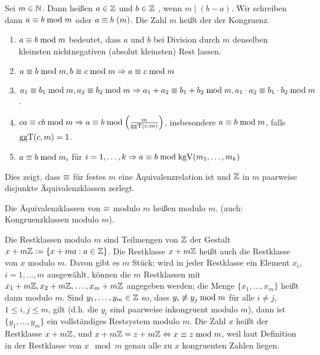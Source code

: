 \begin{defn}
	Sei $m \in \mathbb{N}$. 
	Dann heißen $a \in \mathbb{Z}$ und $b \in \mathbb{Z}$ , wenn $m \mid (b-a)$. 
	Wir schreiben dann $a \equiv b \bmod m$ oder $a \equiv b \ (m)$. 
	Die Zahl $m$ heißt der  der Kongruenz. 
\end{defn}

\begin{folg}
\label{folg_1.1.2.2}
	\begin{enumerate}[(1)]
		\item $a \equiv b \bmod m$ bedeutet, dass $a$ und $b$ bei Division durch $m$ denselben kleinsten nichtnegativen (absolut kleinsten) Rest lassen.
		\item $a \equiv b \bmod m, b \equiv c \bmod m \Rightarrow a \equiv c \bmod m$
		\item $a_1 \equiv b_1 \bmod m, a_2 \equiv b_2 \bmod m \Rightarrow a_1 + a_2 \equiv b_1 + b_2 \bmod m, a_1 \cdot a_2 \equiv b_1 \cdot b_2 \bmod m$.
		\item $ca \equiv cb \bmod m \Rightarrow a \equiv b \bmod \left(\frac{m}{\operatorname{ggT}(c,m)}\right)$, insbesondere $a \equiv b \bmod m$, falls $\operatorname{ggT}(c,m) = 1$.
		\item $a \equiv b \bmod m_i$ für $i = 1, \dots, k \Rightarrow a \equiv b \bmod \operatorname{kgV}(m_1,\dots,m_k)$
	\end{enumerate}
	Dies zeigt, dass $\equiv$ für festes $m$ eine Äquivalenzrelation ist und $\mathbb{Z}$ in $m$ paarweise disjunkte Äquivalenzklassen zerlegt.
\end{folg}

\begin{defn}[Restklasse]
	Die Äquivalenzklassen von $\equiv$ modulo $m$ heißen  modulo $m$. 
	(auch: Kongruenzklassen modulo $m$). 
\end{defn}

\begin{folg}
	Die Restklassen modulo $m$ sind Teilmengen von $\mathbb{Z}$ der Gestalt $x + m\mathbb{Z} := \{x + ma : a \in \mathbb{Z}\}$. 
	Die Restklasse $x + m\mathbb{Z}$ heißt auch die Restklasse von $x$ modulo $m$. 
	Davon gibt es $m$ Stück; wird in jeder Restklasse ein Element $x_i$,\linebreak $i = 1, \dots, m$ ausgewählt, können die $m$ Restklassen mit $x_1 + m\mathbb{Z}, x_2 + m\mathbb{Z}, \dots, x_m + m\mathbb{Z}$ angegeben werden; die Menge $\{x_1,\dots,x_m\}$ heißt dann  modulo $m$. 
	Sind $y_1, \dots, y_m \in \mathbb{Z}$ so, dass $y_i \not\equiv y_j \bmod m$ für alle $i \neq j$, $1 \leq i,j \leq m$, gilt (d.h. die $y_i$ sind paarweise inkongruent modulo $m$), dann ist $\{y_1, \dots, y_m\}$ ein vollständiges Restsystem modulo $m$. 
	Die Zahl $x$ heißt  der Restklasse $x + m\mathbb{Z}$, und $x + m\mathbb{Z} = z + m\mathbb{Z} \Leftrightarrow x \equiv z \bmod m$, weil laut Definition in der Restklasse von $x \mod m$ genau alle zu $x$ kongruenten Zahlen liegen. 
\end{folg}

